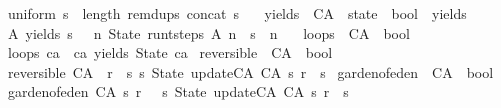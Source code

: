 \begin{isabellebody}
{\isachardoublequoteopen}uniform\ s\ {\isasymequiv}\ length\ {\isacharparenleft}remdups\ {\isacharparenleft}concat\ s{\isacharparenright}{\isacharparenright}\ {\isacharequal}\ {}{\isachardoublequoteclose}\isanewline
\isanewline
{}\isamarkupfalse%
\ yields\ {\isacharcolon}{\isacharcolon}\ {\isachardoublequoteopen}CA\ {\isasymRightarrow}\ state\ {\isasymRightarrow}\ bool{\isachardoublequoteclose}\ {\isacharparenleft}\ {\isacartoucheopen}yields{\isacartoucheclose}\ \ {}{}{\isacharparenright}\ \isanewline
{\isachardoublequoteopen}A\ yields\ s\ {\isasymequiv}\ {\isacharparenleft}{\isasymexists}\ n{\isachardot}\ State\ {\isacharparenleft}run{\isacharunderscore}t{\isacharunderscore}steps\ A\ n{\isacharparenright}\ {\isacharequal}\ s\ {\isasymand}\ n\ {\isachargreater}\ {}{\isacharparenright}{\isachardoublequoteclose}\isanewline
\isanewline
{}\isamarkupfalse%
\ loops\ {\isacharcolon}{\isacharcolon}\ {\isachardoublequoteopen}CA\ {\isasymRightarrow}\ bool{\isachardoublequoteclose}\ \isanewline
{\isachardoublequoteopen}loops\ ca\ {\isasymequiv}\ ca\ yields\ State\ ca{\isachardoublequoteclose}\isanewline
\isanewline
{}\isamarkupfalse%
\ reversible\ {\isacharcolon}{\isacharcolon}\ {\isachardoublequoteopen}CA\ {\isasymRightarrow}\ bool{\isachardoublequoteclose}\ \isanewline
{\isachardoublequoteopen}reversible\ {\isacharparenleft}CA\ {\isacharunderscore}\ r{\isacharparenright}\ {\isacharequal}\ {\isacharparenleft}{\isasymforall}s{\isachardot}\ {\isacharparenleft}{\isasymexists}{\isacharbang}s{}{\isachardot}\ State\ {\isacharparenleft}update{\isacharunderscore}CA\ {\isacharparenleft}CA\ s{}\ r{\isacharparenright}{\isacharparenright}\ {\isacharequal}\ s{\isacharparenright}{\isacharparenright}{\isachardoublequoteclose}\isanewline
\isanewline
{}\isamarkupfalse%
\ garden{\isacharunderscore}of{\isacharunderscore}eden\ {\isacharcolon}{\isacharcolon}\ {\isachardoublequoteopen}CA\ {\isasymRightarrow}\ bool{\isachardoublequoteclose}\ \isanewline
{\isachardoublequoteopen}garden{\isacharunderscore}of{\isacharunderscore}eden\ {\isacharparenleft}CA\ s\ r{\isacharparenright}\ {\isacharequal}\ {\isacharparenleft}{\isasymnot}{\isacharparenleft}{\isasymexists}\ s{}{\isachardot}\ State\ {\isacharparenleft}update{\isacharunderscore}CA\ {\isacharparenleft}CA\ s{}\ r{\isacharparenright}{\isacharparenright}\ {\isacharequal}\ s{\isacharparenright}{\isacharparenright}{\isachardoublequoteclose}\isanewline

\end{isabellebody}
